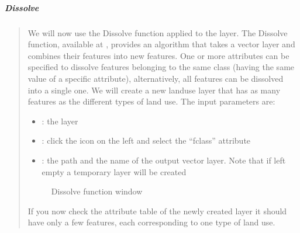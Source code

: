 \documentclass[letterpaper,10pt,english]{sphinxmanual}
\let\sphinxpxdimen\pdfpxdimen\else\newdimen\sphinxpxdimen
\begin{document}
\subparagraph{Dissolve}
\label{\detokenize{vector/overlay:dissolve}}\begin{quote}

We will now use the Dissolve function applied to the  layer. The Dissolve function, available at
, provides an algorithm that takes a vector layer and combines their features
into new features. One or more attributes can be specified to dissolve features belonging to the same class (having
the same value of a specific attribute), alternatively, all features can be dissolved into a single one.
We will create a new landuse layer that has as many features as the different types of land use. The input parameters are:
\begin{itemize}
\item {} 
: the  layer

\item {} 
: click the icon on the left and select the “fclass” attribute

\item {} 
: the path and the name of the output vector layer. Note that if left empty a temporary layer will be created

\end{itemize}

\begin{figure}[htbp]
\centering
\capstart

\noindent\sphinxincludegraphics[width=800\sphinxpxdimen]{{3.3.3_dissolve}.PNG}
\caption{Dissolve function window}\label{\detokenize{vector/overlay:id3}}\end{figure}

If you now check the attribute table of the newly created layer it should have only a few features, each corresponding to one type of land use.

\noindent{}
\end{quote}
\end{document}
